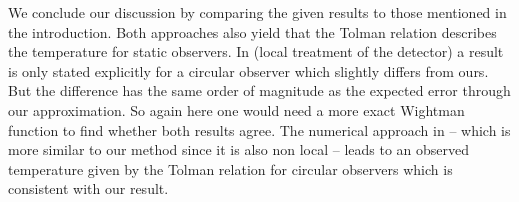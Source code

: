 We conclude our discussion by comparing the given results to those mentioned in the introduction. Both approaches also yield that the Tolman relation describes the temperature for static observers. In \cite{smerlak} (local treatment of the detector) a result is only stated explicitly for a circular observer which slightly differs from ours. But the difference has the same order of magnitude as the expected error through our approximation. So again here one would need a more exact Wightman function to find whether both results agree. The numerical approach in \cite{Hodgkinson} -- which is more similar to our method since it is also non local -- leads to an observed temperature given by the Tolman relation for circular observers which is consistent with our result.    

  